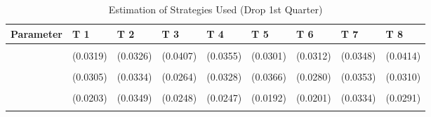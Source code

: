 \begin{table}[!h]
\centering
\caption{Estimation of Strategies Used (Drop 1st Quarter)}
\centering
\begin{tabular}[t]{lllllllll}
\toprule
Parameter & T 1 & T 2 & T 3 & T 4 & T 5 & T 6 & T 7 & T 8\\
\midrule
\cellcolor{gray!10}{gamma} & \cellcolor{gray!10}{0.7542***} & \cellcolor{gray!10}{0.6545***} & \cellcolor{gray!10}{0.7197***} & \cellcolor{gray!10}{0.7524***} & \cellcolor{gray!10}{0.6837***} & \cellcolor{gray!10}{0.7721***} & \cellcolor{gray!10}{0.7521***} & \cellcolor{gray!10}{0.8044***}\\
 & (0.0319) & (0.0326) & (0.0407) & (0.0355) & (0.0301) & (0.0312) & (0.0348) & (0.0414)\\
\cellcolor{gray!10}{AD} & \cellcolor{gray!10}{0.4385***} & \cellcolor{gray!10}{0.3246***} & \cellcolor{gray!10}{0.7918***} & \cellcolor{gray!10}{0.6615***} & \cellcolor{gray!10}{0.7338***} & \cellcolor{gray!10}{0.6906***} & \cellcolor{gray!10}{0.3108***} & \cellcolor{gray!10}{0.3358***}\\
 & (0.0305) & (0.0334) & (0.0264) & (0.0328) & (0.0366) & (0.0280) & (0.0353) & (0.0310)\\
\cellcolor{gray!10}{AC} & \cellcolor{gray!10}{0.0222} & \cellcolor{gray!10}{0.2315***} & \cellcolor{gray!10}{0.1319***} & \cellcolor{gray!10}{0.1423***} & \cellcolor{gray!10}{0.1031***} & \cellcolor{gray!10}{0.1220***} & \cellcolor{gray!10}{0.2344***} & \cellcolor{gray!10}{0.1932***}\\
\addlinespace
 & (0.0203) & (0.0349) & (0.0248) & (0.0247) & (0.0192) & (0.0201) & (0.0334) & (0.0291)\\
\cellcolor{gray!10}{G} & \cellcolor{gray!10}{0.5393***} & \cellcolor{gray!10}{0.4439***} & \cellcolor{gray!10}{0.0763***} & \cellcolor{gray!10}{0.1961***} & \cellcolor{gray!10}{0.1631***} & \cellcolor{gray!10}{0.1875***} & \cellcolor{gray!10}{0.4548***} & \cellcolor{gray!10}{0.4710***}\\
\bottomrule
\end{tabular}
\end{table}